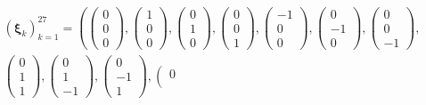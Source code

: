 \begin{equation}\label{eq:velocities}
	\begin{gathered}
		\left(\boldsymbol{\xi}_k\right)_{k=1}^{27}=\left(\left(\begin{array}{l}
			0 \\
			0 \\
			0
		\end{array}\right),\left(\begin{array}{l}
			1 \\
			0 \\
			0
		\end{array}\right),\left(\begin{array}{l}
			0 \\
			1 \\
			0
		\end{array}\right),\left(\begin{array}{l}
			0 \\
			0 \\
			1
		\end{array}\right),\left(\begin{array}{c}
			-1 \\
			0 \\
			0
		\end{array}\right),\left(\begin{array}{c}
			0 \\
			-1 \\
			0
		\end{array}\right),\left(\begin{array}{c}
			0 \\
			0 \\
			-1
		\end{array}\right)\right., \\
		\left.\left(\begin{array}{l}
			0 \\
			1 \\
			1
		\end{array}\right),\left(\begin{array}{c}
			0 \\
			1 \\
			-1
		\end{array}\right),\left(\begin{array}{c}
			0 \\
			-1 \\
			1
		\end{array}\right),\left(\begin{array}{c}
			0 \\

\end{array}
\end{gathered}
\end{equation}
